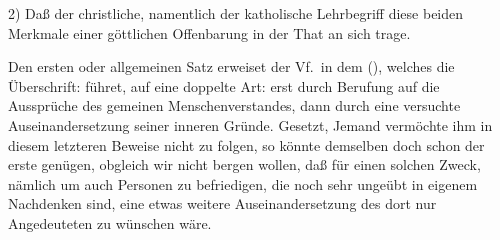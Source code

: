 2) Daß der christliche, namentlich der katholische Lehrbegriff diese beiden Merkmale einer göttlichen Offenbarung in der That an sich trage. \par 
Den ersten oder allgemeinen Satz erweiset der Vf.\ in dem  (), welches die Überschrift:  führet, auf eine doppelte Art: erst durch Berufung auf die Aussprüche des gemeinen Menschenverstandes, dann durch eine versuchte Auseinandersetzung seiner inneren Gründe. Gesetzt, Jemand vermöchte ihm in diesem letzteren Beweise nicht zu folgen, so könnte demselben doch schon der erste genügen, obgleich wir nicht bergen wollen, daß für einen solchen Zweck,
nämlich um auch Personen zu befriedigen, die noch sehr ungeübt  in eigenem Nachdenken sind, eine etwas weitere Auseinandersetzung des dort nur Angedeuteten zu wünschen wäre. \par 
